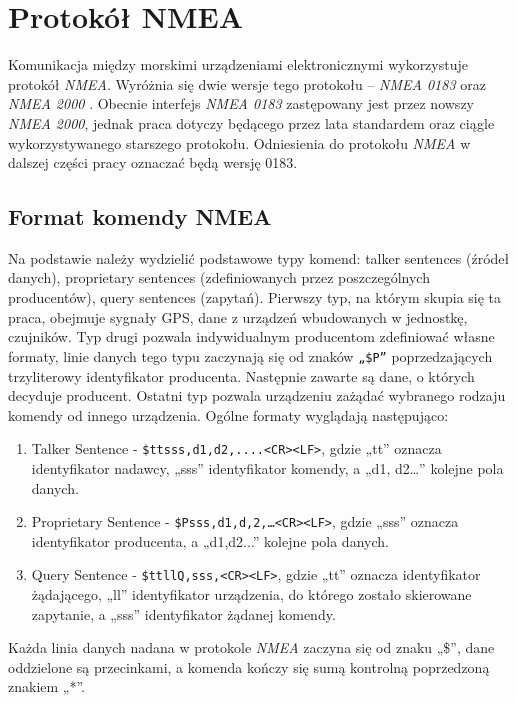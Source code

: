 \documentclass[skorowidz,skroty]{dyplomWEZUT}
\begin{document}


\chapter{Protokół NMEA}\label{chap:NMEA protocol}

Komunikacja między morskimi urządzeniami elektronicznymi wykorzystuje protokół \textit{NMEA}. Wyróżnia się dwie wersje tego protokołu – \textit{NMEA 0183} oraz \textit{NMEA 2000} \cite{NMEA0183Standard, NMEA2000Standard}. Obecnie interfejs \textit{NMEA 0183} zastępowany jest przez nowszy \textit{NMEA 2000}, jednak praca dotyczy będącego przez lata standardem oraz ciągle wykorzystywanego starszego protokołu. Odniesienia do protokołu \textit{NMEA} w dalszej części pracy oznaczać będą wersję 0183. 

\section{Format komendy NMEA}\label{sec:format nmea}

Na podstawie \cite{NMEA0183} należy wydzielić podstawowe typy komend: talker sentences (źródeł danych), proprietary sentences (zdefiniowanych przez poszczególnych producentów), query sentences (zapytań). Pierwszy typ, na którym skupia się ta praca, obejmuje sygnały GPS,  dane z urządzeń wbudowanych w jednostkę, czujników. Typ drugi pozwala indywidualnym producentom zdefiniować własne formaty, linie danych tego typu zaczynają się od znaków \texttt{„\$P”} poprzedzających trzyliterowy identyfikator producenta. Następnie zawarte są dane, o których decyduje producent. Ostatni typ pozwala urządzeniu zażądać wybranego rodzaju komendy od innego urządzenia. Ogólne formaty wyglądają następująco:
\begin{enumerate}
\item Talker Sentence - \texttt{\$ttsss,d1,d2,....<CR><LF>}, gdzie „tt” oznacza identyfikator nadawcy, „sss” identyfikator komendy, a „d1, d2…” kolejne pola danych. 
\item Proprietary Sentence - \texttt{\$Psss,d1,d,2,…<CR><LF>}, gdzie „sss” oznacza identyfikator producenta, a „d1,d2...” kolejne pola danych.
\item Query Sentence - \texttt{\$ttllQ,sss,<CR><LF>}, gdzie „tt” oznacza identyfikator żądającego, „ll” identyfikator urządzenia, do którego zostało skierowane zapytanie, a „sss” identyfikator żądanej komendy.
\end{enumerate}
Każda linia danych nadana w protokole \textit{NMEA} zaczyna się od znaku „\$”, dane oddzielone są przecinkami, a komenda kończy się sumą kontrolną poprzedzoną znakiem „*”.
\end{document}
